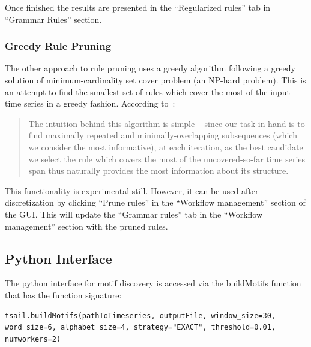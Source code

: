 \documentclass[titlepage, letterpaper, 12pt]{article}
\begin{document}
Once finished the results are presented in the ``Regularized rules'' tab in ``Grammar Rules'' section.

\subsubsection{Greedy Rule Pruning}

The other approach to rule pruning uses a greedy algorithm following a greedy solution of minimum-cardinality set cover problem (an NP-hard problem).  This is an attempt to find the smallest set of rules which cover the most of the input time series in a greedy fashion.  According to~\cite{pruneSite}:
\begin{quote}
	The intuition behind this algorithm is simple -- since our task in hand is to find maximally repeated and minimally-overlapping subsequences (which we consider the most informative), at each iteration, as the best candidate we select the rule which covers the most of the uncovered-so-far time series span thus naturally provides the most information about its structure.
\end{quote}

This functionality is experimental still.  However, it can be used after discretization by clicking ``Prune rules'' in the ``Workflow management'' section of the GUI.  This will update the ``Grammar rules'' tab in the ``Workflow management'' section with the pruned rules.




\subsection{Python Interface}
\label{pythonMotif}
The python interface for motif discovery is accessed via the buildMotifs function that has the function signature:
\begin{lstlisting}
tsail.buildMotifs(pathToTimeseries, outputFile, window_size=30, word_size=6, alphabet_size=4, strategy="EXACT", threshold=0.01, numworkers=2)
\end{lstlisting}
\end{document}
